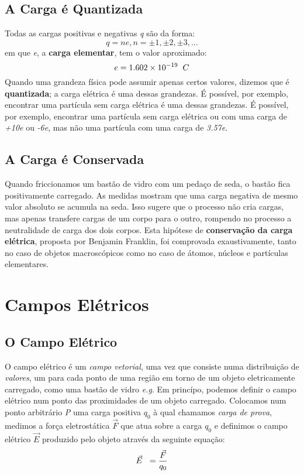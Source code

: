 \documentclass{article}
\begin{document}
\subsection{A Carga é Quantizada}
Todas as cargas positivas e negativas \textit{q} são da forma:
\newline
\[q = ne,   n = \pm 1, \pm 2, \pm 3, \dots \]
\newline
em que \textit{e}, a \textbf{carga elementar}, tem o valor aproximado:
\newline
\[e = 1.602 \times 10^{-19} \hspace{0.2cm}C \]
\newline
Quando uma grandeza física pode assumir apenas certos valores, dizemos que é \textbf{quantizada}; a carga elétrica é uma dessas grandezas. É possível, por exemplo, encontrar uma partícula sem carga elétrica é uma dessas grandezas. É possível, por exemplo, encontrar uma partícula sem carga elétrica ou com uma carga de \textit{+10e} ou \textit{-6e}, mas não uma partícula com uma carga  de \textit{3.57e}.
\newpage
\subsection{A Carga é Conservada}
Quando friccionamos um bastão de vidro com um pedaço de seda, o bastão fica positivamente carregado. As medidas mostram que uma carga negativa de mesmo valor absoluto se acumula na seda. Isso sugere que o processo não cria cargas, mas apenas transfere cargas de um corpo para o outro, rompendo no processo a neutralidade de carga dos dois corpos. Esta hipótese de \textbf{conservação da carga elétrica}, proposta por Benjamin Franklin, foi comprovada exaustivamente, tanto no caso de objetos macroscópicos como no caso de átomos, núcleos e partículas elementares.
\section{Campos Elétricos}
\subsection{O Campo Elétrico}
O campo elétrico é um \textit{campo vetorial}, uma vez que consiste numa distribuição de \textit{valores}, um para cada ponto de uma região em torno de um objeto eletricamente carregado, como uma bastão de vidro \textit{e.g}. Em princípo, podemos definir o campo elétrico num ponto das proximidades de um objeto carregado. Colocamos num ponto arbitrário \textit{P} uma carga positiva \textit{$q_0$} à qual chamamos \textit{carga de prova}, medimos a força eletrostática \(\vec{F}\) que atua sobre a carga \textit{$q_0$} e definimos o campo elétrico \(\vec{E}\) produzido pelo objeto através da seguinte equação:
\newline
\[\vec{E} \hspace{0.2cm}= \frac{\vec{F}}{q_0}\]
\end{document}
